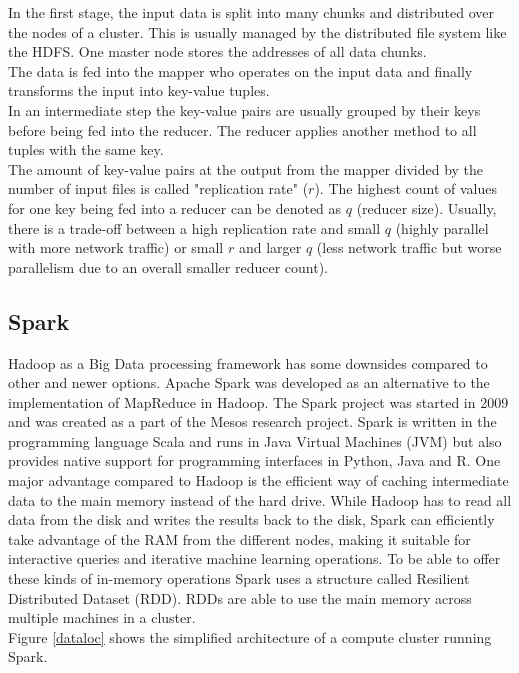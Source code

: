 \noindent In the first stage, the input data is split into many chunks and distributed over the nodes of a cluster. This is usually managed by the distributed file system like the HDFS. One master node stores the addresses of all data chunks.\\
The data is fed into the mapper who operates on the input data and finally transforms the input into key-value tuples.\\
In an intermediate step the key-value pairs are usually grouped by their keys before being fed into the reducer. The reducer applies another method to all tuples with the same key.\\
The amount of key-value pairs at the output from the mapper divided by the number of input files is called "replication rate" ($r$). The highest count of values for one key being fed into a reducer can be denoted as $q$ (reducer size). Usually, there is a trade-off between a high replication rate and small $q$ (highly parallel with more network traffic) or small $r$ and larger $q$ (less network traffic but worse parallelism due to an overall smaller reducer count).

\subsection{Spark}\label{sparksec}

Hadoop as a Big Data processing framework has some downsides compared to other and newer options. Apache Spark was developed as an alternative to the implementation of MapReduce in Hadoop. The Spark project was started in 2009 and was created as a part of the Mesos research project. Spark is written in the programming language Scala and runs in Java Virtual Machines (JVM) but also provides native support for programming interfaces in Python, Java and R. 
One major advantage compared to Hadoop is the efficient way of caching intermediate data to the main memory instead of the hard drive. While Hadoop has to read all data from the disk and writes the results back to the disk, Spark can efficiently take advantage of the RAM from the different nodes, making it suitable for interactive queries and iterative machine learning operations. To be able to offer these kinds of in-memory operations Spark uses a structure called Resilient Distributed Dataset (RDD). RDDs are able to use the main memory across multiple machines in a cluster. \cite[p. 13]{sparkbook1}\\ 
Figure \ref{dataloc} shows the simplified architecture of a compute cluster running Spark. 

